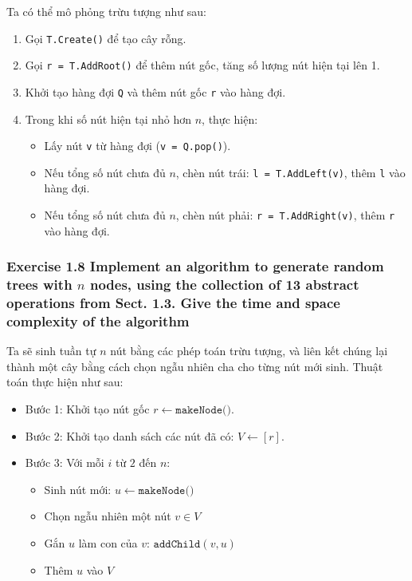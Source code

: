 \documentclass{article}
\begin{document}
	Ta có thể mô phỏng trừu tượng như sau:
	
	\begin{enumerate}
		\item Gọi \texttt{T.Create()} để tạo cây rỗng.
		\item Gọi \texttt{r = T.AddRoot()} để thêm nút gốc, tăng số lượng nút hiện tại lên 1.
		\item Khởi tạo hàng đợi \texttt{Q} và thêm nút gốc \texttt{r} vào hàng đợi.
		\item Trong khi số nút hiện tại nhỏ hơn $n$, thực hiện:
		\begin{itemize}
			\item Lấy nút \texttt{v} từ hàng đợi (\texttt{v = Q.pop()}).
			\item Nếu tổng số nút chưa đủ $n$, chèn nút trái: \texttt{l = T.AddLeft(v)}, thêm \texttt{l} vào hàng đợi.
			\item Nếu tổng số nút chưa đủ $n$, chèn nút phải: \texttt{r = T.AddRight(v)}, thêm \texttt{r} vào hàng đợi.
		\end{itemize}
	\end{enumerate}
	
	\subsubsection*{Exercise 1.8 Implement an algorithm to generate random trees with $n$ nodes, using the collection of 13 abstract operations from Sect. 1.3. Give the time and space complexity of the algorithm}
	
	Ta sẽ sinh tuần tự $n$ nút bằng các phép toán trừu tượng, và liên kết chúng lại thành một cây bằng cách chọn ngẫu nhiên cha cho từng nút mới sinh. Thuật toán thực hiện như sau:
	
	\begin{itemize}
		\item Bước 1: Khởi tạo nút gốc $r \leftarrow \texttt{makeNode()}$.
		\item Bước 2: Khởi tạo danh sách các nút đã có: $V \leftarrow [r]$.
		\item Bước 3: Với mỗi $i$ từ $2$ đến $n$:
		\begin{itemize}
			\item Sinh nút mới: $u \leftarrow \texttt{makeNode()}$
			\item Chọn ngẫu nhiên một nút $v \in V$
			\item Gắn $u$ làm con của $v$: $\texttt{addChild}(v, u)$
			\item Thêm $u$ vào $V$
		\end{itemize}
	\end{itemize}
	
\end{document}
